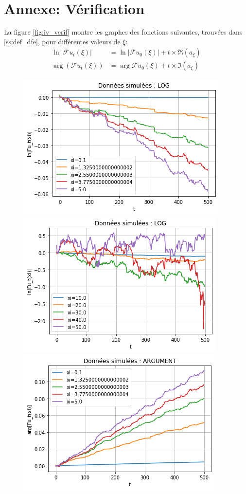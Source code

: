 \documentclass[12pt]{article}
\newcommand{\pth}[1]{\left(#1\right)}
\newcommand{\abs}[1]{\left|#1\right|}
\newcommand{\fr}{\mathcal{F}}
\begin{document}
\newpage

\FloatBarrier
\section{Annexe: Vérification\label{ann:verif}}

La figure \ref{fig:iv_verif} montre les graphes des fonctions suivantes, trouvées dans \ref{ss:def_dfe}, pour différentes valeurs de $\xi$:
\begin{align*}
  \ln\abs{\fr u_t(\xi)}&=\ln\abs{\fr u_0(\xi)}+t\times\Re(a_{\xi})\\
  \arg\pth{\fr u_t(\xi)}&=\arg{\fr u_0(\xi)}+t\times\Im(a_{\xi})
\end{align*}

\begin{figure}[h]
  \begin{center}
    \includegraphics[scale=0.6]{img/iv_verif_pxi.png}
    \includegraphics[scale=0.6]{img/iv_verif_grxi.png}
    \includegraphics[scale=0.6]{img/iv_verif_pxi_im.png}

\end{center}
\end{figure}
\end{document}
